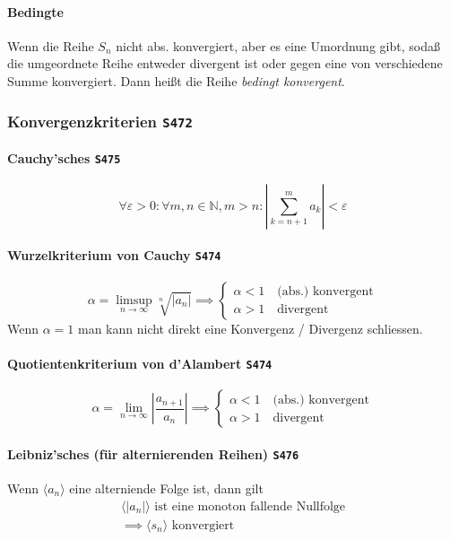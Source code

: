 \documentclass[margin=small, twocolumn]{hsrzf}
\numberwithin{equation}{subsection}
\newcommand{\brpage}[1]{\textcolor{red!70!black}{\small\texttt{S#1}}}
\begin{document}
\paragraph{Bedingte} Wenn die Reihe \(S_n\) nicht abs. konvergiert, aber es eine Umordnung gibt, soda{\ss} die umgeordnete Reihe entweder divergent ist oder gegen eine von verschiedene Summe konvergiert. Dann hei{\ss}t die Reihe \emph{bedingt konvergent}.


\subsubsection{Konvergenzkriterien \brpage{472}}

\paragraph{Cauchy'sches \brpage{475}}
\[
    \forall \varepsilon > 0 : \forall m,n \in \mathbb{N}, m > n:
    \left| \sum_{k=n+1}^m a_k \right| < \varepsilon
\]

\paragraph{Wurzelkriterium von Cauchy \brpage{474}}
\[
    \alpha = \limsup_{n\to\infty} \sqrt[n]{\left| a_n \right|}
    \implies\begin{cases}
        \alpha < 1 \quad \text{(abs.) konvergent} \\
        \alpha > 1 \quad \text{divergent}
    \end{cases}
\]
Wenn \(\alpha = 1\)  man kann nicht direkt eine Konvergenz / Divergenz schliessen.

\paragraph{Quotientenkriterium von d'Alambert \brpage{474}}
\[
    \alpha = \lim_{n\to\infty} \left|\frac{a_{n+1}}{a_n}\right|
    \implies\begin{cases}
        \alpha < 1 \quad \text{(abs.) konvergent} \\
        \alpha > 1 \quad \text{divergent}
    \end{cases}
\]

\paragraph{Leibniz'sches (f\"ur alternierenden Reihen) \brpage{476}}
Wenn \(\langle a_n \rangle\) eine alterniende Folge ist, dann gilt
\begin{gather*}
    \langle |a_n| \rangle \text{ ist eine monoton fallende Nullfolge} \\
    \implies \langle s_n \rangle \text{ konvergiert}
\end{gather*}
\end{document}
